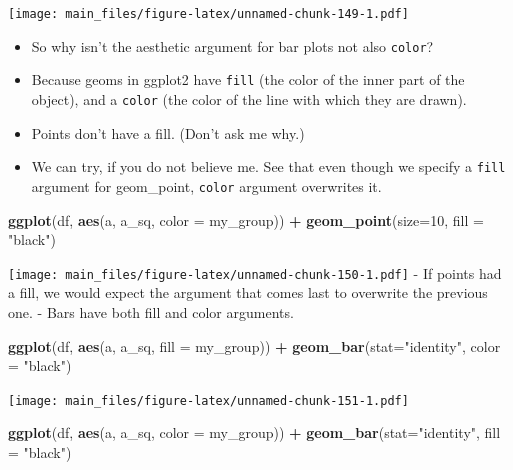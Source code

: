 \documentclass[
]{book}
\newenvironment{Shaded}{\begin{snugshade}}{\end{snugshade}}
\newcommand{\AttributeTok}[1]{\textcolor[rgb]{0.13,0.29,0.53}{#1}}
\newcommand{\DecValTok}[1]{\textcolor[rgb]{0.00,0.00,0.81}{#1}}
\newcommand{\FunctionTok}[1]{\textcolor[rgb]{0.13,0.29,0.53}{\textbf{#1}}}
\newcommand{\NormalTok}[1]{#1}
\newcommand{\SpecialCharTok}[1]{\textcolor[rgb]{0.81,0.36,0.00}{\textbf{#1}}}
\newcommand{\StringTok}[1]{\textcolor[rgb]{0.31,0.60,0.02}{#1}}
\begin{document}
\texttt{[image: main\_files/figure-latex/unnamed-chunk-149-1.pdf]}

\begin{itemize}
\item
  So why isn't the aesthetic argument for bar plots not also \texttt{color}?
\item
  Because geoms in ggplot2 have \texttt{fill} (the color of the inner part of the object), and a \texttt{color} (the color of the line with which they are drawn).
\item
  Points don't have a fill. (Don't ask me why.)
\item
  We can try, if you do not believe me. See that even though we specify a \texttt{fill} argument for geom\_point, \texttt{color} argument overwrites it.
\end{itemize}

\begin{Shaded}
\begin{Highlighting}[]
\FunctionTok{ggplot}\NormalTok{(df, }\FunctionTok{aes}\NormalTok{(a, a\_sq, }\AttributeTok{color =}\NormalTok{ my\_group)) }\SpecialCharTok{+} \FunctionTok{geom\_point}\NormalTok{(}\AttributeTok{size=}\DecValTok{10}\NormalTok{, }\AttributeTok{fill =} \StringTok{"black"}\NormalTok{)}
\end{Highlighting}
\end{Shaded}

\texttt{[image: main\_files/figure-latex/unnamed-chunk-150-1.pdf]}
- If points had a fill, we would expect the argument that comes last to overwrite the previous one.
- Bars have both fill and color arguments.

\begin{Shaded}
\begin{Highlighting}[]
\FunctionTok{ggplot}\NormalTok{(df, }\FunctionTok{aes}\NormalTok{(a, a\_sq, }\AttributeTok{fill =}\NormalTok{ my\_group)) }\SpecialCharTok{+} \FunctionTok{geom\_bar}\NormalTok{(}\AttributeTok{stat=}\StringTok{"identity"}\NormalTok{, }\AttributeTok{color =} \StringTok{"black"}\NormalTok{)}
\end{Highlighting}
\end{Shaded}

\texttt{[image: main\_files/figure-latex/unnamed-chunk-151-1.pdf]}

\begin{Shaded}
\begin{Highlighting}[]
\FunctionTok{ggplot}\NormalTok{(df, }\FunctionTok{aes}\NormalTok{(a, a\_sq, }\AttributeTok{color =}\NormalTok{ my\_group)) }\SpecialCharTok{+} \FunctionTok{geom\_bar}\NormalTok{(}\AttributeTok{stat=}\StringTok{"identity"}\NormalTok{, }\AttributeTok{fill =} \StringTok{"black"}\NormalTok{)}
\end{Highlighting}
\end{Shaded}
\end{document}

